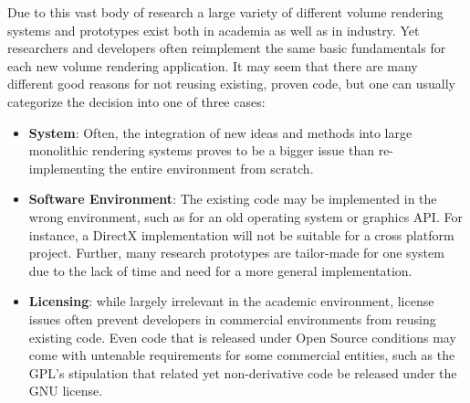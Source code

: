 Due to this vast body of research a large variety of different volume
rendering systems and prototypes exist both in academia as well as
in industry. Yet researchers and developers often reimplement the
same basic fundamentals for each new volume rendering application. It
may seem that there are many different good reasons for not reusing
existing, proven code, but one can usually categorize the decision into
one of three cases:

\begin{itemize}

  \item \textbf{System}:
	Often, the integration of new ideas and methods
	into large monolithic rendering systems proves to be a
	bigger issue than re-implementing the entire environment
	from scratch.

  \item \textbf{Software Environment}: The existing code may be
  implemented in the wrong environment, such as for an old operating
  system or graphics API. For instance, a DirectX implementation will
  not be suitable for a cross platform project. Further, many research
  prototypes are tailor-made for one system due to the lack of time and
  need for a more general implementation.

  \item \textbf{Licensing}: while largely irrelevant in the academic
  environment, license issues often prevent developers in commercial
  environments from reusing existing code. Even code that is released
  under Open Source conditions may come with untenable requirements for
  some commercial entities, such as the GPL's stipulation that related
  yet non-derivative code be released under the GNU license.

\end{itemize}

